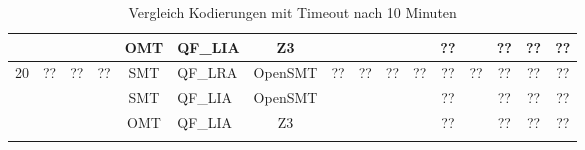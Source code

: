 \begin{landscape}
\begin{longtable}{|c|c|c|c|c|l|c|c|c|c|c|c|c|c|c|c|}
            & & & & OMT & QF\_LIA & Z3 & & & & & ?? & & ?? & ?? & ?? \\
            \hline
            \multirow{3}{*}{20} & \multirow{3}{*}{??} & \multirow{3}{*}{??} & \multirow{3}{*}{??} & SMT & QF\_LRA & OpenSMT & \multirow{3}{*}{??} & \multirow{3}{*}{??} & \multirow{3}{*}{??} & \multirow{3}{*}{??} & ?? & \multirow{3}{*}{??} & ?? & ?? & ?? \\
            & & & & SMT & QF\_LIA & OpenSMT & & & & & ?? & & ?? & ?? & ?? \\
            & & & & OMT & QF\_LIA & Z3 & & & & & ?? & & ?? & ?? & ?? \\
            \hline
        \caption{Vergleich Kodierungen mit Timeout nach 10 Minuten}
        \label{tab:vglkodierungreal}
    \end{longtable}
\end{landscape}
